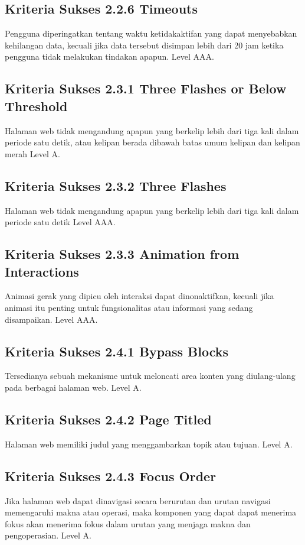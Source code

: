 \subsection{Kriteria Sukses 2.2.6 Timeouts}
\label{sec:kriteria_2.2.6}
Pengguna diperingatkan tentang waktu ketidakaktifan yang dapat menyebabkan kehilangan data, kecuali jika data tersebut disimpan lebih dari 20 jam ketika pengguna tidak melakukan tindakan apapun.
Level AAA.

\subsection{Kriteria Sukses 2.3.1 Three Flashes or Below Threshold}
\label{sec:kriteria_2.3.1}
Halaman web tidak mengandung apapun yang berkelip lebih dari tiga kali dalam periode satu detik, atau kelipan berada dibawah batas umum kelipan dan kelipan merah
Level A.

\subsection{Kriteria Sukses 2.3.2 Three Flashes}
\label{sec:kriteria_2.3.2}
Halaman web tidak mengandung apapun yang berkelip lebih dari tiga kali dalam periode satu detik
Level AAA.

\subsection{Kriteria Sukses 2.3.3 Animation from Interactions}
\label{sec:kriteria_2.3.3}
Animasi gerak yang dipicu oleh interaksi dapat dinonaktifkan, kecuali jika animasi itu penting untuk fungsionalitas atau informasi yang sedang disampaikan.
Level AAA.

\subsection{Kriteria Sukses 2.4.1 Bypass Blocks}
\label{sec:kriteria_2.4.1}
Tersedianya sebuah mekanisme untuk meloncati area konten yang diulang-ulang pada berbagai halaman web.
Level A.

\subsection{Kriteria Sukses 2.4.2 Page Titled}
\label{sec:kriteria_2.4.2}
Halaman web memiliki judul yang menggambarkan topik atau tujuan.
Level A.

\subsection{Kriteria Sukses 2.4.3 Focus Order}
\label{sec:kriteria_2.4.3}
Jika halaman web dapat dinavigasi secara berurutan dan urutan navigasi memengaruhi makna atau operasi, maka komponen yang dapat dapat menerima fokus akan menerima fokus dalam urutan yang menjaga makna dan pengoperasian.
Level A.

